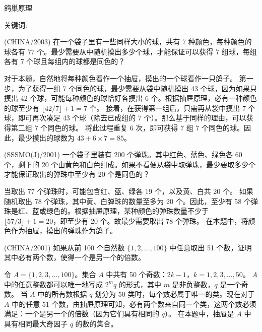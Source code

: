\begin{center}
  {\fontsize{30pt}{26pt}\selectfont
    \hypertarget{鸽巢原理}{鸽巢原理} \label{鸽巢原理}
  }
\end{center}
\separator
\begin{center}
    关键词: 
\end{center}
\vspace{0.5pt}
\begin{questions}
    \question (CHINA/2003) 在一个袋子里有一些同样大小的球，共有 7 种颜色，每种颜色的球各有 77 个。最少需要从中随机摸出多少个球，才能保证可以获得 7 组球，每组各有 7 个球且每组内的球都是同色的？
\begin{solution}
对于本题，自然地将每种颜色看作一个抽屉，摸出的一个球看作一只鸽子。
第一步，为了获得一组 7 个同色的球，最少需要从袋中随机摸出 43 个球，因为如果只摸出 42 个球，可能每种颜色的球恰好各摸出 6 个。根据抽屉原理，必有一种颜色的球至少有 $\lfloor 42/7 \rfloor + 1 = 7$ 个。
接着，在获得第一组后，只需再从袋中摸出 7 个球，即可再次凑足 43 个球（除去已成组的 7 个）。那么基于同样的理由，可以获得第二组 7 个同色的球。
将此过程重复 6 次，即可获得 7 组 7 个同色的球。因此，最少摸出的球数为 $43 + 6 \times 7 = 85$。
\end{solution}

\question (SSSMO(J)/2001) 一个袋子里装有 200 个弹珠。其中红色、蓝色、绿色各 60 个，剩下的 20 个由黄色和白色组成。如果不看便从袋中取弹珠，最少要取多少个才能保证取出的弹珠中至少有 20 个是同色的？
\begin{solution}
当取出 77 个弹珠时，可能包含红、蓝、绿各 19 个，以及黄、白共 20 个。
如果随机取出 78 个弹珠，其中黄、白弹珠的数量至多为 20 个。因此，至少有 58 个弹珠是红、蓝或绿色的。根据抽屉原理，某种颜色的弹珠数量不少于 $\lfloor 57/3 \rfloor + 1 = 20$，即至少有 20 个。故最少需要取出 78 个弹珠。
在本题中，将颜色作为抽屉，摸出的弹珠作为鸽子。
\end{solution}

\question (CHINA/2001) 如果从前 100 个自然数 $\{1, 2, \dots, 100\}$ 中任意取出 51 个数，证明其中必有两个数，使得一个是另一个的倍数。
\begin{solution}
令 $A = \{1, 2, 3, \dots, 100\}$。集合 $A$ 中共有 50 个奇数：$2k - 1$，$k = 1, 2, 3, \dots, 50$。 $A$ 中的任意整数都可以唯一地写成 $2^m q$ 的形式，其中 $m$ 是非负整数，$q$ 是一个奇数。
当 $A$ 中的所有数根据 $q$ 划分为 50 类时，每个数必属于唯一的类。现在对于 $A$ 中的任意 51 个数，由抽屉原理可知，必有两个数来自同一个类，这两个数必须满足：一个是另一个的倍数（因为它们具有相同的 $q$）。
在本题中，抽屉是 $A$ 中具有相同最大奇因子 $q$ 的数的集合。
\end{solution}


\end{questions}
